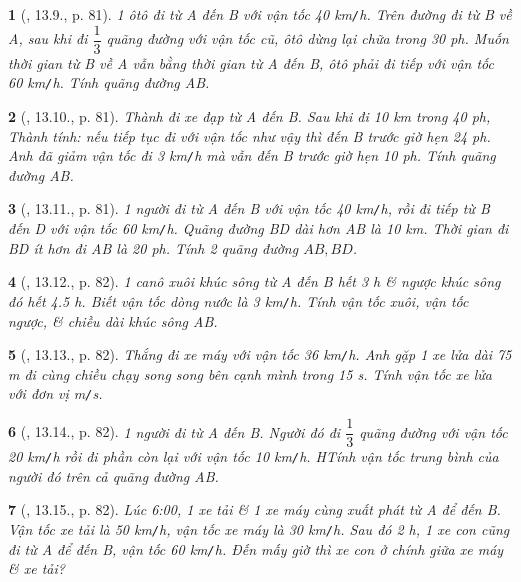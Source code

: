 \documentclass{article}
\newtheorem{baitoan}{}
\begin{document}
\begin{baitoan}[\cite{TLCT_THCS_Toan_6_so_hoc}, 13.9., p. 81]
	1 ôtô đi từ A đến B với vận tốc {\rm40 km{\tt/}h}. Trên đường đi từ B về A, sau khi đi $\dfrac{1}{3}$ quãng đường với vận tốc cũ, ôtô dừng lại chữa trong {\rm30 ph}. Muốn thời gian từ B về A vẫn bằng thời gian từ A đến B, ôtô phải đi tiếp với vận tốc {\rm60 km{\tt/}h}. Tính quãng đường AB.
\end{baitoan}

\begin{baitoan}[\cite{TLCT_THCS_Toan_6_so_hoc}, 13.10., p. 81]
	Thành đi xe đạp từ A đến B. Sau khi đi {\rm10 km} trong {\rm40 ph}, Thành tính: nếu tiếp tục đi với vận tốc như vậy thì đến B trước giờ hẹn {\rm24 ph}. Anh đã giảm vận tốc đi {\rm3 km{\tt/}h} mà vẫn đến B trước giờ hẹn {\rm10 ph}. Tính quãng đường AB.
\end{baitoan}

\begin{baitoan}[\cite{TLCT_THCS_Toan_6_so_hoc}, 13.11., p. 81]
	1 người đi từ A đến B với vận tốc {\rm40 km{\tt/}h}, rồi đi tiếp từ B đến D với vận tốc {\rm60 km{\tt/}h}. Quãng đường BD dài hơn AB là {\rm10 km}. Thời gian đi BD ít hơn đi AB là {\rm20 ph}. Tính 2 quãng đường $AB,BD$.
\end{baitoan}

\begin{baitoan}[\cite{TLCT_THCS_Toan_6_so_hoc}, 13.12., p. 82]
	1 canô xuôi khúc sông từ A đến B hết {\rm3 h} \& ngược khúc sông đó hết {\rm4.5 h}. Biết vận tốc dòng nước là {\rm3 km{\tt/}h}. Tính vận tốc xuôi, vận tốc ngược, \& chiều dài khúc sông AB.
\end{baitoan}

\begin{baitoan}[\cite{TLCT_THCS_Toan_6_so_hoc}, 13.13., p. 82]
	Thắng đi xe máy với vận tốc {\rm36 km{\tt/}h}. Anh gặp 1 xe lửa dài {\rm75 m} đi cùng chiều chạy song song bên cạnh mình trong {\rm15 s}. Tính vận tốc xe lửa với đơn vị {\rm m{\tt/}s}.
\end{baitoan}

\begin{baitoan}[\cite{TLCT_THCS_Toan_6_so_hoc}, 13.14., p. 82]
	1 người đi từ A đến B. Người đó đi $\dfrac{1}{3}$ quãng đường với vận tốc {\rm20 km{\tt/}h} rồi đi phần còn lại với vận tốc {\rm10 km{\tt/}h}. HTính vận tốc trung bình của người đó trên cả quãng đường AB.
\end{baitoan}

\begin{baitoan}[\cite{TLCT_THCS_Toan_6_so_hoc}, 13.15., p. 82]
	Lúc {\rm6:00}, 1 xe tải \& 1 xe máy cùng xuất phát từ A để đến B. Vận tốc xe tải là {\rm50 km{\tt/}h}, vận tốc xe máy là {\rm30 km{\tt/}h}. Sau đó {\rm2 h}, 1 xe con cũng đi từ A để đến B, vận tốc {\rm60 km{\tt/}h}. Đến mấy giờ thì xe con ở chính giữa xe máy \& xe tải?
\end{baitoan}
\end{document}
